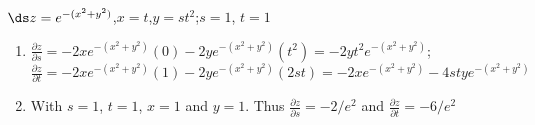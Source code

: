 {$\ds z=e^{-(x^2+y^2)}$,\quad $x=t$,\quad $y=st^2$;\quad $s=1$, $t=1$
}
{\begin{enumerate}
	\item $\frac{\partial z}{\partial s} = -2xe^{-(x^2+y^2)}(0) -2ye^{-(x^2+y^2)}(t^2) = -2yt^2e^{-(x^2+y^2)}$;\\
	$\frac{\partial z}{\partial t} = -2xe^{-(x^2+y^2)}(1)-2ye^{-(x^2+y^2)}(2st) = -2xe^{-(x^2+y^2)}-4stye^{-(x^2+y^2)}$
	
	\item		With $s=1$, $t=1$, $x=1$ and $y=1$. Thus $\frac{\partial z}{\partial s} = -2/e^2$ and $\frac{\partial z}{\partial t} = -6/e^2$
\end{enumerate}
}
